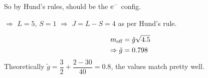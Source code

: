 \begin{parts}
\begin{subparts}
		So by Hund's rules,
		should be the $\mathrm{e}^{-}$ config.
		
		$\Rightarrow$ $L=5$, $S=1$ $\Rightarrow$ $J=L-S=4$ as per Hund's rule.
		
		\subpart
		\begin{align*}
			m_\textnormal{eff} &= \tilde{g} \sqrt{\num{4.5}} \\
			\Rightarrow \tilde{g} &= \num{0.798}
		\end{align*}
		Theoretically $\tilde{g} = \dfrac{3}{2} + \dfrac{2-30}{40} = \num{0.8}$, the values match pretty well.
	\end{subparts}
\end{parts}